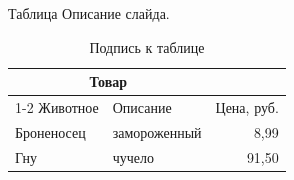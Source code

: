 
\begin{frame}{Таблица}
    Описание слайда.
    \begin{table}
        \centering
        \caption{Подпись к таблице}
        \begin{tabular}{llr}
            \toprule
            \multicolumn{2}{c}{Товар} & \\
            \cmidrule(r){1-2}
            Животное   & Описание     & Цена, руб. \\
            \midrule
            Броненосец & замороженный & 8,99       \\
            Гну        & чучело       & 91,50      \\
            \bottomrule
        \end{tabular}
    \end{table}
\end{frame}
